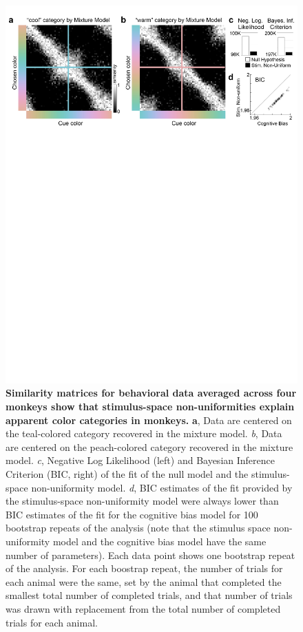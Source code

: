 \begin{figure}
    \begin{fullwidth}
    \centering
    \includegraphics[width=\textwidth+4cm,trim={0 19cm 0 0},clip]{../Figures/flat/F4_TCCResults_3.jpg}
    \caption{\textbf{Similarity matrices for behavioral data averaged across four monkeys show that stimulus-space non-uniformities explain apparent color categories in monkeys.}
    \textbf{a}, Data are centered on the teal-colored category recovered in the mixture model. 
	\emph{b}, Data are centered on the peach-colored category recovered in the mixture model. 
	\emph{c}, Negative Log Likelihood (left) and Bayesian Inference Criterion (BIC, right) of the fit of the null model and the stimulus-space non-uniformity model. 
	\emph{d}, BIC estimates of the fit provided by the stimulus-space non-uniformity model were always lower than BIC estimates of the fit for the cognitive bias model for 100 bootstrap repeats of the analysis (note that the stimulus space non-uniformity model and the cognitive bias model have the same number of parameters). 
	Each data point shows one bootstrap repeat of the analysis. For each boostrap repeat, the number of trials for each animal were the same, set by the animal that completed the smallest total number of completed trials, and that number of trials was drawn with replacement from the total number of completed trials for each animal. 
    } 
    \label{fig:TCCOutput}
    \end{fullwidth}
\end{figure}

